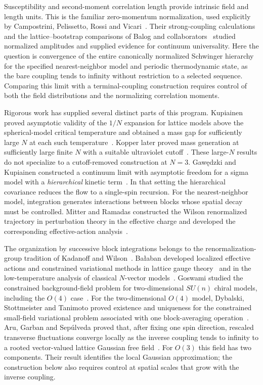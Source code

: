 Susceptibility and second-moment correlation length provide intrinsic
field and length units.  This is the familiar zero-momentum normalization,
used explicitly by Campostrini, Pelissetto, Rossi and
Vicari~\cite{CampostriniPelissettoRossiVicari1997}.
Their strong-coupling calculations and the lattice--bootstrap comparisons
of Balog and collaborators~\cite{BalogEtAl1999} studied normalized
amplitudes and supplied evidence for continuum universality.
Here the question is convergence of the entire canonically normalized
Schwinger hierarchy for the specified nearest-neighbor model and periodic
thermodynamic state, as the bare coupling tends to infinity without
restriction to a selected sequence.  Comparing this limit with a
terminal-coupling construction requires control of both the field
distributions and the normalizing correlation moments.

Rigorous work has supplied several distinct parts of this program.
Kupiainen proved asymptotic validity of the $1/N$ expansion for lattice
models above the spherical-model critical temperature and obtained a
mass gap for sufficiently large $N$ at each such
temperature~\cite{Kupiainen}.
Kopper later proved mass generation at sufficiently large finite $N$
with a suitable ultraviolet cutoff~\cite{Kopper}.  These large-$N$
results do not specialize to a cutoff-removed construction at $N=3$.
Gaw\k{e}dzki and Kupiainen constructed a continuum limit with asymptotic
freedom for a sigma model with a \emph{hierarchical} kinetic
term~\cite{GawedzkiKupiainen}.  In that setting the hierarchical covariance reduces the flow to
a single-spin recursion.  For the nearest-neighbor model, integration
generates interactions between blocks whose spatial decay must be
controlled.
Mitter and Ramadas constructed the Wilson renormalized trajectory in
perturbation theory in the effective charge and developed the
corresponding effective-action analysis~\cite{MitterRamadas}.

The organization by successive block integrations belongs to the
renormalization-group tradition of Kadanoff and
Wilson~\cite{Kadanoff,Wilson}.  Ba\l aban developed localized effective actions and constrained
variational methods in lattice gauge theory~\cite{BalabanGaugeFlow,BalabanGaugeVariational}
and in the low-temperature analysis of classical $N$-vector
models~\cite{BalabanFlow,BalabanVariational}.
Goswami studied the constrained background-field problem for
two-dimensional $SU(n)$ chiral models, including the $O(4)$
case~\cite{Goswami2024}.
For the two-dimensional $O(4)$ model, Dybalski, Stottmeister and
Tanimoto proved existence and uniqueness for the constrained
small-field variational problem associated with one block-averaging
operation~\cite{DybalskiStottmeisterTanimotoVariational}.
Aru, Garban and Sep\'ulveda proved that, after fixing one spin
direction, rescaled transverse fluctuations converge locally as the
inverse coupling tends to infinity to a rooted vector-valued lattice
Gaussian free field~\cite[Theorem~1.3]{AGS}.  For $O(3)$ this field has
two components.  Their result identifies the local Gaussian
approximation; the construction below also requires control at
spatial scales that grow with the inverse coupling.

